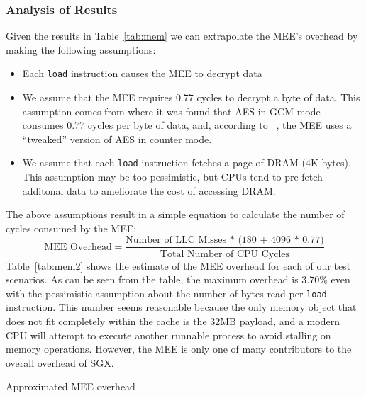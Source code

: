\documentclass[../../../main.tex]{subfiles}
\begin{document}
\subsubsection*{Analysis of Results}
Given the results in Table~\ref{tab:mem} we can extrapolate the MEE's
overhead by making the following assumptions:
\begin{itemize}
  \item Each \texttt{load} instruction causes the MEE to decrypt data
  \item We assume that the MEE requires 0.77 cycles to decrypt a byte of data.
    This assumption comes from \cite{cyclesaes} where it was found that
    AES in GCM mode consumes 0.77 cycles per byte of data, and, according to
    ~\Intel, the MEE uses a ``tweaked'' version of AES in counter mode.
  \item We assume that each \texttt{load} instruction fetches a page
    of DRAM (4K bytes). This assumption may be too pessimistic, but CPUs
    tend to pre-fetch additonal data to ameliorate the cost of accessing
    DRAM.
\end{itemize}
The above assumptions result in a simple equation to calculate the number
of cycles consumed by the MEE:
\begin{equation*}
  \text{MEE Overhead} = \frac{\text{Number of LLC Misses
    * (180 + 4096 * 0.77)}}{\text{Total Number of CPU Cycles}}
\end{equation*}
Table~\ref{tab:mem2} shows the estimate of the MEE overhead for each
of our test scenarios. As can be seen from the table, the maximum
overhead is 3.70\% even with the pessimistic assumption about the
number of bytes read per \texttt{load} instruction. This number seems
reasonable because the only memory object that does not fit completely
within the cache is the 32MB payload, and a modern CPU will attempt to
execute another runnable process to avoid stalling on memory
operations. However, the MEE is only one of many contributors to the
overall overhead of SGX.

\begin{table}[H]
  \caption{Approximated MEE overhead}
  \label{tab:mem2}
\end{table}
\end{document}
